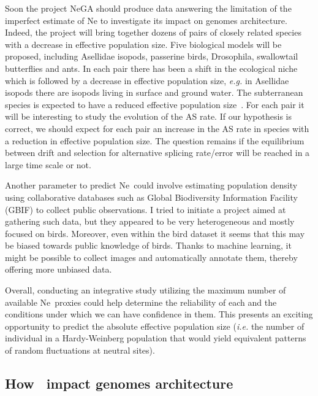 Soon the project NeGA should produce data answering the limitation of the imperfect estimate of \acrshort{Ne} to investigate its impact on genomes architecture. Indeed, the project will bring together dozens of pairs of closely related species with a decrease in \gls{effective population size}. Five biological models will be proposed, including Asellidae isopods, passerine birds, Drosophila, swallowtail butterflies and ants. In each pair there has been a shift in the ecological niche which is followed by a decrease in \gls{effective population size}, \textit{e.g.} in Asellidae isopods there are isopods living in surface and ground water. The subterranean species is expected to have a reduced \gls{effective population size}~\citep{lefebure_less_2017}. For each pair it will be interesting to study the evolution of the \acrshort{AS} rate. If our hypothesis is correct, we should expect for each pair an increase in the \acrshort{AS} rate in species with a reduction in \gls{effective population size}. The question remains if the equilibrium between drift and selection for alternative splicing rate/error will be reached in a large time scale or not.

Another parameter to predict \acrshort{Ne}~could involve estimating population density using collaborative databases such as Global Biodiversity Information Facility (GBIF) to collect public observations. I tried to initiate a project aimed at gathering such data, but they appeared to be very heterogeneous and mostly focused on birds. Moreover, even within the bird dataset it seems that this may be biased towards public knowledge of birds. Thanks to machine learning, it might be possible to collect images and automatically annotate them, thereby offering more unbiased data.

Overall, conducting an integrative study utilizing the maximum number of available \acrshort{Ne}~proxies could help determine the reliability of each and the conditions under which we can have confidence in them. This presents an exciting opportunity to predict the absolute \gls{effective population size} (\textit{i.e.} the number of individual in a Hardy-Weinberg population that would yield equivalent patterns of random fluctuations at neutral sites).


\subsection{How \Ne~impact genomes architecture}

